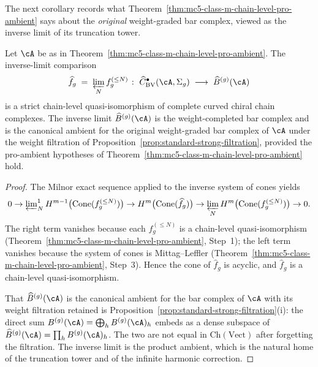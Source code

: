 The next corollary records what Theorem~\textup{\ref{thm:mc5-class-m-chain-level-pro-ambient}}
says about the \emph{original} weight-graded bar complex, viewed as the
inverse limit of its truncation tower.

\begin{corollary}
\label{cor:mc5-class-m-chain-level-on-inverse-limit}
\ClaimStatusProvedHere
{}
Let $\cA$ be as in Theorem~\textup{\ref{thm:mc5-class-m-chain-level-pro-ambient}}.
The inverse-limit comparison
\[
\widehat{f}_g \;=\; \varprojlim_N f_g^{(\leq N)}
\;\colon\;
\widehat{C}^{\bullet}_{\mathrm{BV}}(\cA, \Sigma_g)
\;\longrightarrow\;
\widehat{B}^{(g)}(\cA)
\]
is a strict chain-level quasi-isomorphism of complete curved chiral
chain complexes. The inverse limit $\widehat{B}^{(g)}(\cA)$ is the
weight-completed bar complex and is the canonical ambient for the
original weight-graded bar complex of $\cA$ under the weight filtration
of Proposition~\textup{\ref{prop:standard-strong-filtration}}, provided
the pro-ambient hypotheses of
Theorem~\textup{\ref{thm:mc5-class-m-chain-level-pro-ambient}} hold.
\end{corollary}

\begin{proof}
The Milnor exact sequence applied to the inverse system of cones yields
\[
0 \to \varprojlim\nolimits^1_N H^{m-1}\bigl(\mathrm{Cone}(f_g^{(\leq N)})\bigr)
\to H^m\bigl(\mathrm{Cone}(\widehat{f}_g)\bigr)
\to \varprojlim_N H^m\bigl(\mathrm{Cone}(f_g^{(\leq N)})\bigr) \to 0.
\]
The right term vanishes because each $f_g^{(\leq N)}$ is a chain-level
quasi-isomorphism
\textup{(}Theorem~\textup{\ref{thm:mc5-class-m-chain-level-pro-ambient}},
Step~1\textup{)}; the left term vanishes because the system of cones
is Mittag--Leffler
\textup{(}Theorem~\textup{\ref{thm:mc5-class-m-chain-level-pro-ambient}},
Step~3\textup{)}. Hence the cone of $\widehat{f}_g$ is acyclic, and
$\widehat{f}_g$ is a chain-level quasi-isomorphism.

That $\widehat{B}^{(g)}(\cA)$ is the canonical ambient for the bar
complex of $\cA$ with its weight filtration retained is
Proposition~\textup{\ref{prop:standard-strong-filtration}}(i): the
direct sum $B^{(g)}(\cA) = \bigoplus_h B^{(g)}(\cA)_h$ embeds as a
dense subspace of $\widehat{B}^{(g)}(\cA) = \prod_h B^{(g)}(\cA)_h$.
The two are not equal in $\mathrm{Ch}(\mathrm{Vect})$ after forgetting
the filtration. The inverse limit is the product ambient, which is the
natural home of the truncation tower and of the infinite harmonic
correction.
\end{proof}


